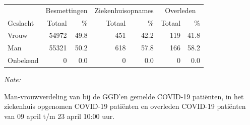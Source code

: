 \documentclass[
  english,
  man,floatsintext]{apa6}
\begin{document}
\begin{table}
\centering\begingroup\fontsize{11}{13}\selectfont

\begin{threeparttable}
\begin{tabular}{lrrrrrr}
\toprule
\multicolumn{1}{c}{ } & \multicolumn{2}{c}{Besmettingen} & \multicolumn{2}{c}{Ziekenhuisopnames} & \multicolumn{2}{c}{Overleden} \\
\cmidrule(l{3pt}r{3pt}){2-3} \cmidrule(l{3pt}r{3pt}){4-5} \cmidrule(l{3pt}r{3pt}){6-7}
Geslacht & Totaal & \% & Totaal & \% & Totaal & \%\\
\midrule
Vrouw & 54972 & 49.8 & 451 & 42.2 & 119 & 41.8\\
Man & 55321 & 50.2 & 618 & 57.8 & 166 & 58.2\\
Onbekend & 0 & 0.0 & 0 & 0.0 & 0 & 0.0\\
\bottomrule
\end{tabular}
\begin{tablenotes}
\item \textit{Note: } 
\item Man-vrouwverdeling van bij de GGD’en gemelde COVID-19 patiënten, in het ziekenhuis opgenomen COVID-19 patiënten en overleden COVID-19 patiënten van 09 april t/m 23 april 10:00 uur.
\end{tablenotes}
\end{threeparttable}
\endgroup{}
\end{table}
\newpage
\end{document}
